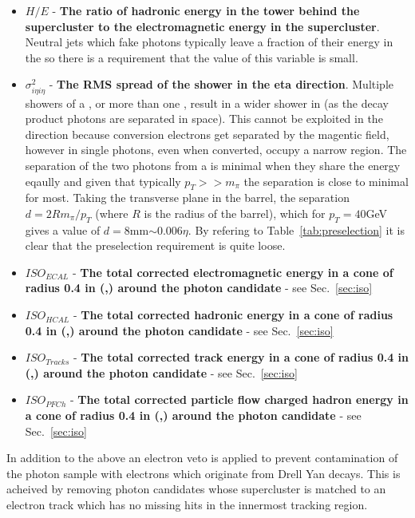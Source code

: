 \begin{itemize}
  \item $H/E$ - \textbf{The ratio of hadronic energy in the \HCAL tower behind the supercluster to the electromagnetic energy in the supercluster}. Neutral jets which fake photons typically leave a fraction of their energy in the \HCAL so there is a requirement that the value of this variable is small.
  \item $\sigma^{2}_{i\eta i\eta}$ - \textbf{The RMS spread of the shower in the eta direction}. Multiple showers of a \pizero, or more than one \pizero, result in a wider shower in \eta (as the \pizero decay product photons are separated in space). This cannot be exploited in the \phi direction because conversion electrons get separated by the magentic field, however in \eta single photons, even when converted, occupy a narrow region. The separation of the two photons from a \pizero is minimal when they share the energy eqaully and given that typically $p_{T}>>m_{\pi}$ the separation is close to minimal for most. Taking the transverse plane in the barrel, the separation $d=2Rm_{\pi}/p_{T}$ (where $R$ is the radius of the barrel), which for $p_{T}=40$GeV gives a value of $d=$8mm$\sim0.006\eta$. By refering to Table~\ref{tab:preselection} it is clear that the preselection requirement is quite loose.
  \item $ISO_{ECAL}$ - \textbf{The total \rho corrected electromagnetic energy in a cone of radius 0.4 in (\eta,\phi) around the photon candidate} - see Sec.~\ref{sec:iso}
  \item $ISO_{HCAL}$ - \textbf{The total \rho corrected hadronic energy in a cone of radius 0.4 in (\eta,\phi) around the photon candidate} - see Sec.~\ref{sec:iso}
  \item $ISO_{Tracks}$ - \textbf{The total \rho corrected track energy in a cone of radius 0.4 in (\eta,\phi) around the photon candidate} - see Sec.~\ref{sec:iso}
  \item $ISO_{PFCh}$ - \textbf{The total \rho corrected particle flow charged hadron energy in a cone of radius 0.4 in (\eta,\phi) around the photon candidate} - see Sec.~\ref{sec:iso}
\end{itemize}

In addition to the above an electron veto is applied to prevent contamination of the photon sample with electrons which originate from Drell Yan decays. This is acheived by removing photon candidates whose supercluster is matched to an electron track which has no missing hits in the innermost tracking region.

